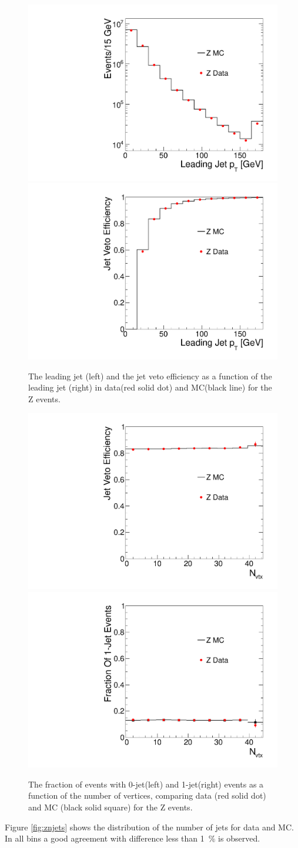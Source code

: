 \begin{figure}[!hbtp]
\centering
\includegraphics[width=.45\textwidth]{figures/ZjetpT.pdf}
\includegraphics[width=.45\textwidth]{figures/Zjetvetoeff.pdf}
\caption{The leading jet \pt(left) and the jet veto efficiency as a function 
of the leading jet \pt(right) in data(red solid dot) and MC(black line) for the Z events. }
\label{fig:jetveto_z}
\end{figure}
\begin{figure}[!hbtp]
\centering
\includegraphics[width=.45\textwidth]{figures/Zjetvetoeff_vs_nvtx.pdf}
\includegraphics[width=.45\textwidth]{figures/Zonejeteff_vs_nvtx.pdf}
\caption{The fraction of events with 0-jet(left) and 1-jet(right) events 
as a function of the number of vertices, comparing data (red solid dot) 
and MC (black solid square) for the Z events. }
\label{fig:jetfrac_z}
\end{figure}
Figure \ref{fig:znjets} shows the distribution of the number of jets for data and MC. 
In all bins a good agreement with difference less than 1~\% is observed. 

